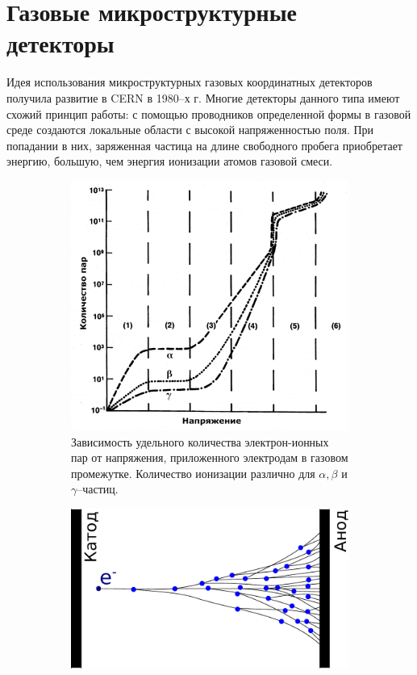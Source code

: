 \section{Газовые микроструктурные детекторы}
Идея использования микроструктурных газовых координатных детекторов получила развитие в CERN в 1980--х г. Многие детекторы данного типа имеют схожий принцип работы: с помощью проводников определенной формы в газовой среде создаются локальные области с высокой напряженностью поля. При попадании в них, заряженная частица на длине свободного пробега приобретает энергию, большую, чем энергия ионизации атомов газовой смеси. 
\begin{figure}[h]
	\centering
	\begin{subfigure}{.45\textwidth}
		\centering
		\includegraphics[width=0.9\linewidth]{img/Gas_discharge_gr.png}
		\caption{Зависимость удельного количества электрон-ионных пар от напряжения, приложенного электродам в газовом промежутке. Количество ионизации различно для $\alpha,\beta$ и $\gamma$--частиц.}
	\end{subfigure}
	\hspace{20pt}
	\begin{subfigure}{.45\textwidth}
		\centering
		\includegraphics[width=1\linewidth]{img/Electron_avalanche.pdf}

\end{subfigure}
\end{figure}
